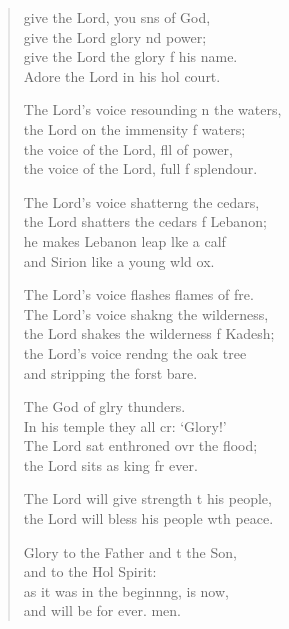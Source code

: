 \begin{verse}
  \begin{patverse}
     give the Lord, you sns of God,\Med\\
    give the Lord glory nd power;\\
give the Lord the glory f his name.\Med\\
    Adore the Lord in his hol court.

The Lord’s voice resounding n the waters,\Med\\
    the Lord on the immensity f waters;\\
the voice of the Lord, fll of power,\Med\\
    the voice of the Lord, full f splendour.

The Lord’s voice shatterng the cedars,\Med\\
    the Lord shatters the cedars f Lebanon;\\
he makes Lebanon leap lke a calf\Med\\
    and Sirion like a young w\pointup{\i}ld ox.

The Lord’s voice flashes flames of f\pointup{\i}re.\Flex\\
    The Lord’s voice shakng the wilderness,\Med\\
    the Lord shakes the wilderness f Kadesh;\\
the Lord’s voice rendng the oak tree\Med\\
    and stripping the forst bare.

The God of glry thunders.\Med\\
    In his temple they all cr: ‘Glory!’\\
The Lord sat enthroned ovr the flood;\Med\\
    the Lord sits as king fr ever.

The Lord will give strength t his people,\Med\\
    the Lord will bless his people w\pointup{\i}th peace.

Glory to the Father and t the Son,\Med\\
    and to the Hol Spirit:\\
as it was in the beginnng, is now,\Med\\
    and will be for ever. men.
  \end{patverse}
\end{verse}
